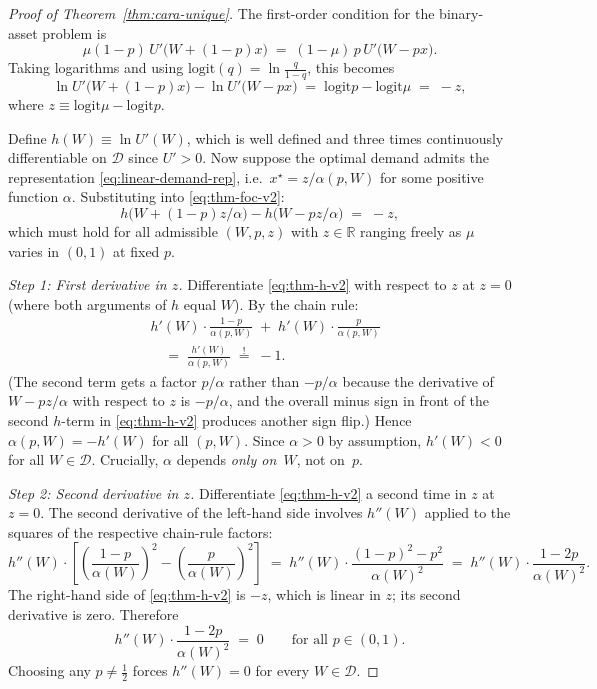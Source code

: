 \documentclass[12pt,letterpaper]{article}
\theoremstyle{definition}
\theoremstyle{remark}
\newcommand{\R}{\mathbb{R}}
\newcommand{\logit}{\mathrm{logit}}
\newcommand{\1}{\mathbf{1}}
\begin{document}
\begin{proof}[Proof of Theorem~\ref{thm:cara-unique}]
The first-order condition for the binary-asset problem is
\[
   \mu(1-p)\,U'\!\bigl(W+(1-p)x\bigr) \;=\; (1-\mu)\,p\,U'\!\bigl(W-px\bigr).
\]
Taking logarithms and using $\logit(q)=\ln\tfrac{q}{1-q}$, this
becomes
\begin{equation}
   \ln U'\!\bigl(W+(1-p)x\bigr) - \ln U'\!\bigl(W-px\bigr)
   \;=\; \logit p - \logit\mu
   \;=\; -z,
\label{eq:thm-foc-v2}
\end{equation}
where $z\equiv\logit\mu-\logit p$.

Define $h(W)\equiv\ln U'(W)$, which is well defined and three times
continuously differentiable on $\mathcal{D}$ since $U'>0$.
Now suppose the optimal demand admits the representation
\eqref{eq:linear-demand-rep}, i.e.\ $x^{\star}=z/\alpha(p,W)$ for some
positive function $\alpha$.  Substituting into \eqref{eq:thm-foc-v2}:
\begin{equation}
   h\!\bigl(W+(1-p)z/\alpha\bigr) - h\!\bigl(W-pz/\alpha\bigr) \;=\; -z,
\label{eq:thm-h-v2}
\end{equation}
which must hold for all admissible $(W,p,z)$ with $z\in\R$ ranging freely
as $\mu$ varies in $(0,1)$ at fixed $p$.

\emph{Step 1: First derivative in $z$.} Differentiate
\eqref{eq:thm-h-v2} with respect to $z$ at $z=0$ (where both arguments of
$h$ equal $W$). By the chain rule:
\begin{align*}
   &h'(W)\cdot\frac{1-p}{\alpha(p,W)}
   \;+\; h'(W)\cdot\frac{p}{\alpha(p,W)} \\
   &\quad=\; \frac{h'(W)}{\alpha(p,W)}
   \;\stackrel{!}{=}\; -1.
\end{align*}
(The second term gets a factor $p/\alpha$ rather than $-p/\alpha$
because the derivative of $W-pz/\alpha$ with respect to $z$ is
$-p/\alpha$, and the overall minus sign in front of the second $h$-term
in \eqref{eq:thm-h-v2} produces another sign flip.)
Hence $\alpha(p,W)=-h'(W)$ for all $(p,W)$.
Since $\alpha>0$ by assumption, $h'(W)<0$ for all $W\in\mathcal{D}$.
Crucially, $\alpha$ depends \emph{only on~$W$}, not on~$p$.

\emph{Step 2: Second derivative in $z$.} Differentiate
\eqref{eq:thm-h-v2} a second time in $z$ at $z=0$. The second
derivative of the left-hand side involves $h''(W)$ applied to the
squares of the respective chain-rule factors:
\[
   h''(W)\cdot\!\left[\!\left(\frac{1-p}{\alpha(W)}\right)^{\!2}
   - \left(\frac{p}{\alpha(W)}\right)^{\!2}\right]
   \;=\; h''(W)\cdot\frac{(1-p)^{2}-p^{2}}{\alpha(W)^{2}}
   \;=\; h''(W)\cdot\frac{1-2p}{\alpha(W)^{2}}.
\]
The right-hand side of \eqref{eq:thm-h-v2} is $-z$, which is linear in
$z$; its second derivative is zero. Therefore
\[
   h''(W)\cdot\frac{1-2p}{\alpha(W)^{2}} \;=\; 0
   \qquad \text{for all } p\in(0,1).
\]
Choosing any $p\neq\tfrac12$ forces $h''(W)=0$ for every
$W\in\mathcal{D}$.


\end{proof}
\end{document}
